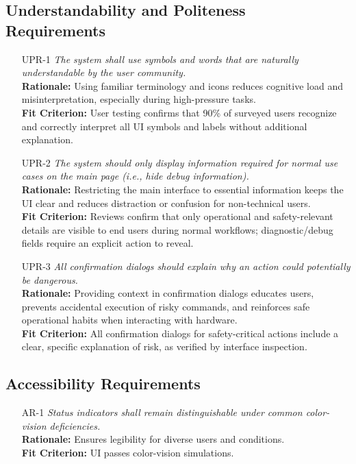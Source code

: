 \documentclass[12pt]{article}
\begin{document}
\subsection{Understandability and Politeness Requirements}
\begin{itemize}[leftmargin=*]
  \item[UPR-1] \emph{The system shall use symbols and words that are naturally
          understandable by the user community.}\\[2mm]
        \textbf{Rationale:} Using familiar terminology and icons reduces cognitive load and misinterpretation, especially during high-pressure tasks.\\
        \textbf{Fit Criterion:} User testing confirms that 90\% of surveyed users recognize and correctly interpret all UI symbols and labels without additional explanation.

  \item[UPR-2] \emph{The system should only display information required for normal use
          cases on the main page (i.e., hide debug information).}\\[2mm]
        \textbf{Rationale:} Restricting the main interface to essential information keeps the UI clear and reduces distraction or confusion for non-technical users.\\
        \textbf{Fit Criterion:} Reviews confirm that only operational and safety-relevant details are visible to end users during normal workflows; diagnostic/debug fields require an explicit action to reveal.

  \item[UPR-3] \emph{All confirmation dialogs should explain why an action could
          potentially be dangerous.}\\[2mm]
        \textbf{Rationale:} Providing context in confirmation dialogs educates users, prevents accidental execution of risky commands, and reinforces safe operational habits when interacting with hardware.\\
        \textbf{Fit Criterion:} All confirmation dialogs for safety-critical actions include a clear, specific explanation of risk, as verified by interface inspection.
\end{itemize}

\subsection{Accessibility Requirements}
\begin{itemize}[leftmargin=*]
  \item[AR-1] \emph{Status indicators shall remain distinguishable under common
          color-vision deficiencies.}\\[2mm]
        \textbf{Rationale:} Ensures legibility for diverse users and conditions.\\
        \textbf{Fit Criterion:} UI passes color-vision simulations.
\end{itemize}
\end{document}
